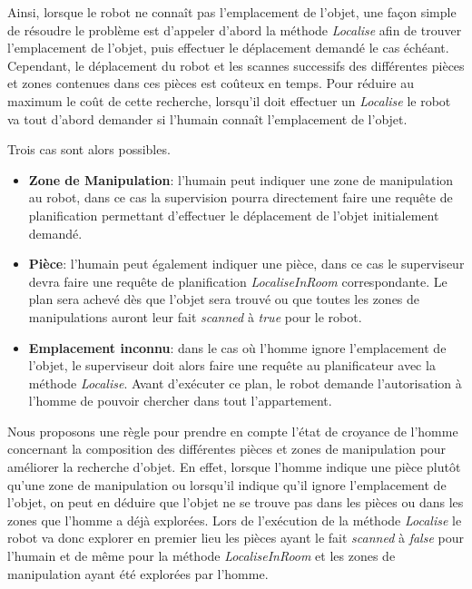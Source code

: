 \documentclass[a4paper,11pt,twoside]{StyleThese}
\begin{document}
Ainsi, lorsque le robot ne connaît pas l'emplacement de l'objet, une façon simple de résoudre le problème est d'appeler d'abord la méthode \textit{Localise} afin de trouver l'emplacement de l'objet, puis effectuer le déplacement demandé le cas échéant. Cependant, le déplacement du robot et les scannes successifs des différentes pièces et zones contenues dans ces pièces est coûteux en temps.
Pour réduire au maximum le coût de cette recherche, lorsqu'il doit effectuer un \textit{Localise} le robot va tout d'abord demander si l'humain connaît l'emplacement de l'objet.

Trois cas sont alors possibles.
\begin{itemize}
\item \textbf{Zone de Manipulation}: l'humain peut indiquer une zone de manipulation au robot, dans ce cas la supervision pourra directement faire une requête de planification permettant d'effectuer le déplacement de l'objet initialement demandé.

\item \textbf{Pièce}: l'humain peut également indiquer une pièce, dans ce cas le superviseur devra faire une requête de planification \textit{LocaliseInRoom} correspondante. Le plan sera achevé dès que l'objet sera trouvé ou que toutes les zones de manipulations auront leur fait \textit{scanned} à \textit{true} pour le robot.

\item \textbf{Emplacement inconnu}: dans le cas où l'homme ignore l'emplacement de l'objet, le superviseur doit alors faire une requête au planificateur avec la méthode \textit{Localise}. Avant d'exécuter ce plan, le robot demande l'autorisation à l'homme de pouvoir chercher dans tout l'appartement.
\end{itemize}  


Nous proposons une règle pour prendre en compte l'état de croyance de l'homme concernant la composition des différentes pièces et zones de manipulation pour améliorer la recherche d'objet.
En effet, lorsque l'homme indique une pièce plutôt qu'une zone de manipulation ou lorsqu'il indique qu'il ignore l'emplacement de l'objet, on peut en déduire que l'objet ne se trouve pas dans les pièces ou dans les zones que l'homme a déjà explorées. Lors de l'exécution de la méthode \textit{Localise} le robot va donc explorer en premier lieu les pièces ayant le fait \textit{scanned} à \textit{false} pour l'humain et de même pour la méthode \textit{LocaliseInRoom} et les zones de manipulation ayant été explorées par l'homme.
\end{document}
